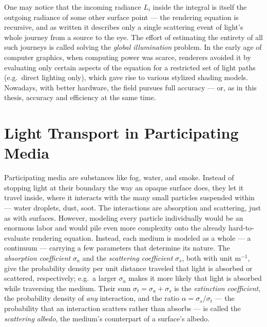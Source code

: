 One may notice that the incoming radiance $L_i$ inside the integral is itself the outgoing radiance of some other surface point --- the rendering equation is recursive, and as written it describes only a single scattering event of light's whole journey from a source to the eye. The effort of estimating the entirety of all such journeys is called solving the \emph{global illumination} problem. In the early age of computer graphics, when computing power was scarce, renderers avoided it by evaluating only certain aspects of the equation for a restricted set of light paths (e.g.\ direct lighting only), which gave rise to various stylized shading models. Nowadays, with better hardware, the field pursues full accuracy --- or, as in this thesis, accuracy and efficiency at the same time.

\section{Light Transport in Participating Media}
\label{sec:bg_media}
Participating media are substances like fog, water, and smoke. Instead of stopping light at their boundary the way an opaque surface does, they let it travel inside, where it interacts with the many small particles suspended within --- water droplets, dust, soot. The interactions are absorption and scattering, just as with surfaces. However, modeling every particle individually would be an enormous labor and would pile even more complexity onto the already hard-to-evaluate rendering equation. Instead, each medium is modeled as a whole --- a continuum --- carrying a few parameters that determine its nature. The \emph{absorption coefficient} $\sigma_a$ and the \emph{scattering coefficient} $\sigma_s$, both with unit $\mathrm{m^{-1}}$, give the probability density per unit distance traveled that light is absorbed or scattered, respectively; e.g.\ a larger $\sigma_a$ makes it more likely that light is absorbed while traversing the medium. Their sum $\sigma_t = \sigma_a + \sigma_s$ is the \emph{extinction coefficient}, the probability density of \emph{any} interaction, and the ratio $\alpha = \sigma_s / \sigma_t$ --- the probability that an interaction scatters rather than absorbs --- is called the \emph{scattering albedo}, the medium's counterpart of a surface's albedo.

